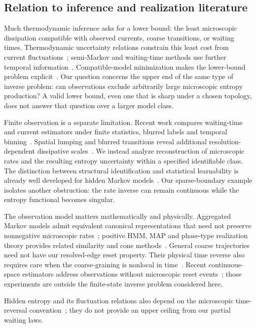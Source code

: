 \subsection{Relation to inference and realization literature}
Much thermodynamic inference asks for a lower bound: the least microscopic
dissipation compatible with observed currents, coarse transitions, or
waiting times. Thermodynamic uncertainty relations constrain this least
cost from current fluctuations~\cite{BaratoSeifert2015,Gingrich2016};
semi-Markov and waiting-time methods use further temporal
information~\cite{Martinez2019,vanDerMeer2022,Harunari2022}.
Compatible-model minimization makes the lower-bound problem
explicit~\cite{SkinnerDunkel2021PNAS,SkinnerDunkel2021PRL,Ehrich2021,Nitzan2023}.
Our question concerns the upper end of the same type of inverse problem:
can observations exclude arbitrarily large microscopic entropy production?
A valid lower bound, even one that is sharp under a chosen topology, does
not answer that question over a larger model class.

Finite observation is a separate limitation. Recent work compares
waiting-time and current estimators under finite statistics, blurred
labels and temporal binning~\cite{FritzErtelSeifert2025}. Spatial lumping
and blurred transitions reveal additional resolution-dependent
dissipative scales~\cite{YuHarunari2024}.
We instead analyze reconstruction of microscopic rates and the resulting
entropy uncertainty within a specified identifiable class. The distinction
between structural identification and statistical learnability is already
well developed for hidden Markov models~\cite{Gassiat2016,Abraham2023}.
Our sparse-boundary example isolates another obstruction: the rate inverse
can remain continuous while the entropy functional becomes singular.

The observation model matters mathematically and physically. Aggregated
Markov models admit equivalent canonical representations that need not
preserve nonnegative microscopic rates~\cite{Bruno2005}; positive HMM, MAP
and phase-type realization theory provides related similarity and cone
methods~\cite{Vanluyten2008,HorvathTelek2007,HeZhang2006,HeZhang2008}.
General coarse trajectories need not have our resolved-edge reset
property. Their physical time reverse also requires care when the
coarse-graining is nonlocal in time~\cite{Blom2024,BiskerReply2024}.
Recent continuous-space estimators address observations without
microscopic reset events~\cite{FritzSeifert2026}; those experiments are
outside the finite-state inverse problem considered here.

Hidden entropy and its fluctuation relations also depend on the microscopic time-reversal convention~\cite{KawaguchiNakayama2013}; they do not provide an upper ceiling from our partial waiting laws.
